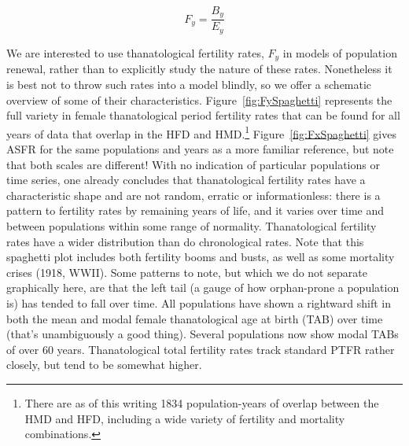 \documentclass{article}
\begin{document}
\begin{equation}
F_y = \frac{B_y}{E_y}
\end{equation}

We are interested to use thanatological fertility rates, $F_y$ in
models of population renewal, rather than to explicitly study the nature of these rates.
Nonetheless it is best not to throw such rates into a model blindly, so we
offer a schematic overview of some of their characteristics.
Figure~\ref{fig:FySpaghetti} represents the full variety in
female thanatological period fertility rates that can be found for all years
of data that overlap in the HFD and HMD.\footnote{There are as of this writing
1834 population-years of overlap between the HMD and HFD, including a wide
variety of fertility and mortality combinations.} Figure~\ref{fig:FxSpaghetti} gives ASFR for the same
populations and years as a more familiar reference, but note that both scales are different! With no indication of particular populations or time series, one already concludes that thanatological fertility rates have a characteristic shape and are not random, erratic or informationless: there is a pattern to fertility rates by remaining years of life, and it varies over time and between populations within some range of normality. Thanatological fertility rates have a wider distribution than do chronological rates. Note that this spaghetti plot includes both fertility booms and busts, as
well as some mortality crises (1918, WWII). Some patterns to note, but which we
do not separate graphically here, are that the left tail (a gauge of how
orphan-prone a population is) has tended to fall over time. All populations have
shown a rightward shift in both the mean and modal female thanatological age at
birth (TAB) over time (that's unambiguously a good thing). Several populations
now show modal TABs of over 60 years. Thanatological total fertility rates track
standard PTFR rather closely, but tend to be somewhat higher. 
\end{document}

